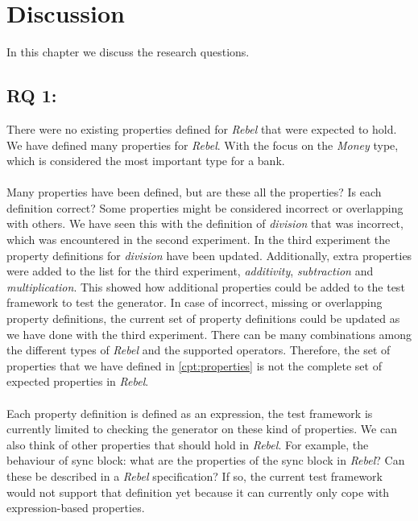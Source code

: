 \chapter{Discussion}
\label{cpt:discussion}
In this chapter we discuss the research questions.

\section{RQ 1: \rqOne{}}
There were no existing properties defined for \textit{Rebel} that were expected
to hold. We have defined many properties for \textit{Rebel}. With the focus on
the \textit{Money} type, which is considered the most important type for a
bank.\\
\\
Many properties have been defined, but are these all the properties? Is each
definition correct? Some properties might be considered incorrect or overlapping
with others. We have seen this with the definition of \textit{division} that was
incorrect, which was encountered in the second experiment. In the
third experiment the property definitions for \textit{division} have been
updated. Additionally, extra properties were added to the list for the third
experiment, \textit{additivity}, \textit{subtraction} and
\textit{multiplication}. This showed how additional properties could be added to
the test framework to test the generator. In case of incorrect, missing or
overlapping property definitions, the current set of property definitions could
be updated as we have done with the third experiment. There can be many
combinations among the different types of \textit{Rebel} and the supported
operators. Therefore, the set of properties that we have defined in
\autoref{cpt:properties} is not the complete set of expected properties in
\textit{Rebel}.\\
\\
Each property definition is defined as an expression, the test framework is
currently limited to checking the generator on these kind of properties. We can also
think of other properties that should hold in \textit{Rebel}. For example, the
behaviour of sync block: what are the properties of the sync block in
\textit{Rebel}? Can these be described in a \textit{Rebel} specification? If so,
the current test framework would not support that definition yet because it can
currently only cope with expression-based properties.

